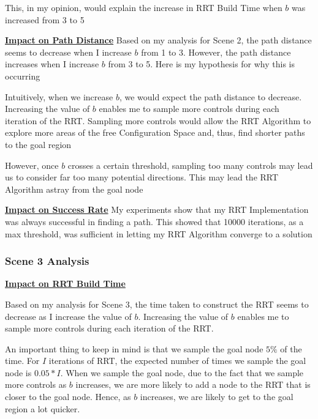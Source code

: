 \documentclass{article}
\begin{document}
This, in my opinion, would explain the increase in RRT Build Time when $b$ was increased from 3 to 5 \newline 

\textbf{\underline{Impact on Path Distance}} \newline
Based on my analysis for Scene 2, the path distance seems to decrease when I increase $b$ from 1 to 3. However, the path distance increases when I increase $b$ from 3 to 5. Here is my hypothesis for why this is occurring \newline 

Intuitively, when we increase $b$, we would expect the path distance to decrease. Increasing the value of $b$ enables me to sample more controls during each iteration of the RRT. Sampling more controls would allow the RRT Algorithm to explore more areas of the free Configuration Space and, thus, find shorter paths to the goal region \newline 

However, once $b$ crosses a certain threshold, sampling too many controls may lead us to consider far too many potential directions. This may lead the RRT Algorithm astray from the goal node \newline 

\textbf{\underline{Impact on Success Rate}} \newline
My experiments show that my RRT Implementation was always successful in finding a path. This showed that 10000 iterations, as a max threshold, was sufficient in letting my RRT Algorithm converge to a solution

\subsubsection{Scene 3 Analysis}
\textbf{\underline{Impact on RRT Build Time}} \newline

Based on my analysis for Scene 3, the time taken to construct the RRT seems to decrease as I increase the value of $b$. Increasing the value of $b$ enables me to sample more controls during each iteration of the RRT. \newline 

An important thing to keep in mind is that we sample the goal node $5\%$ of the time. For $I$ iterations of RRT, the expected number of times we sample the goal node is $0.05 * I$. When we sample the goal node, due to the fact that we sample more controls as $b$ increases, we are more likely to add a node to the RRT that is closer to the goal node. Hence, as $b$ increases, we are likely to get to the goal region a lot quicker. \newline 
\end{document}
